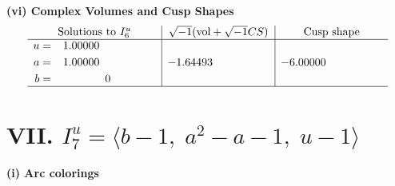 \documentclass[1p]{elsarticle_modified}
\theoremstyle{definition}
\newcommand{\I}{\sqrt{-1}}
\begin{document}
\newpage\flushleft \textbf{(vi) Complex Volumes and Cusp Shapes}
$$\begin{array}{c|c|c}  
\text{Solutions to }I^u_{6}& \I (\text{vol} + \sqrt{-1}CS) & \text{Cusp shape}\\
 \hline 
\begin{aligned}
u &= \phantom{-}1.00000\phantom{ +0.000000I} \\
a &= \phantom{-}1.00000\phantom{ +0.000000I} \\
b &= \phantom{-0.000000 } 0\end{aligned}
 & -1.64493\phantom{ +0.000000I} & -6.00000\phantom{ +0.000000I}\\
 \hline 
 \end{array}$$\newpage\newpage\renewcommand{\arraystretch}{1}
\centering \section*{VII. $I^u_{7}= \langle b-1,\;a^2- a-1,\;u-1 \rangle$}
\flushleft \textbf{(i) Arc colorings}\\
\end{document}

